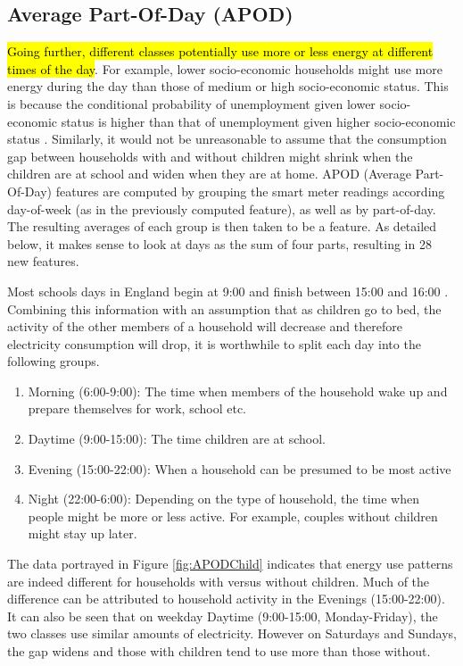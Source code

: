 \subsection*{Average Part-Of-Day (APOD)}
\hl{Going further, different classes potentially use more or less energy at different times of the day}. For example, lower socio-economic households might use more energy during the day than those of medium or high socio-economic status. This is because the conditional probability of unemployment given lower socio-economic status is higher than that of unemployment given higher socio-economic status \cite{Bartley}. Similarly, it would not be unreasonable to assume that the consumption gap between households with and without children might shrink when the children are at school and widen when they are at home. APOD (Average Part-Of-Day) features are computed by grouping the smart meter readings according day-of-week (as in the previously computed feature), as well as by part-of-day. The resulting averages of each group is then taken to be a feature. As detailed below, it makes sense to look at days as the sum of four parts, resulting in 28 new features.

Most schools days in England begin at 9:00 and finish between 15:00 and 16:00 \cite{school_times}. Combining this information with  an assumption that as children go to bed, the activity of the other members of a household will decrease and therefore electricity consumption will drop, it is worthwhile to split each day into the following groups.
\begin{enumerate}
\item Morning (6:00-9:00): The time when members of the household wake up and prepare themselves for work, school etc.
\item Daytime (9:00-15:00): The time children are at school.
\item Evening (15:00-22:00):  When a household can be presumed to be most active
\item Night (22:00-6:00): Depending on the type of household, the time when people might be more or less active. For example, couples without children might stay up later.
\end{enumerate}
\APODChild %


The data portrayed in Figure \ref{fig:APODChild} indicates that energy use patterns are indeed different for households with versus without children. Much of the difference can be attributed to household activity in the Evenings (15:00-22:00). It can also be seen that on weekday Daytime (9:00-15:00, Monday-Friday), the two classes use similar amounts of electricity. However on Saturdays and Sundays, the gap widens and those with children tend to use more than those without. 

